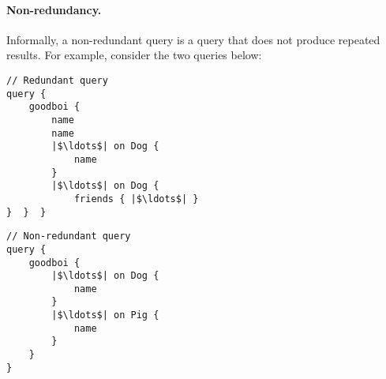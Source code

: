 \iffalse
\begin{verbatim}
Lemma are_grounded_in_ground_typed_nf (s : wfGraphQLSchema)
                                      (type_in_scope : Name)
                                      (queries : seq Query) :
        are_grounded s type_in_scope queries ->
        are_in_ground_typed_nf s queries.
\end{verbatim}
\fi





\paragraph{Non-redundancy.}

Informally, 
a non-redundant query is a query that does not produce repeated results.
For example, consider the two queries below:

\smallskip

\begin{minipage}[t]{.25\textwidth}
\begin{verbatim}
// Redundant query
query {
    goodboi {
        name
        name
        |$\ldots$| on Dog {
            name
        }
        |$\ldots$| on Dog {
            friends { |$\ldots$| }
}  }  }
\end{verbatim}
\end{minipage}%
\begin{minipage}[t]{.25\textwidth}
\begin{verbatim}
// Non-redundant query
query {
    goodboi {
        |$\ldots$| on Dog {
            name
        }
        |$\ldots$| on Pig {
            name
        }
    } 
}
\end{verbatim} 
\end{minipage}

